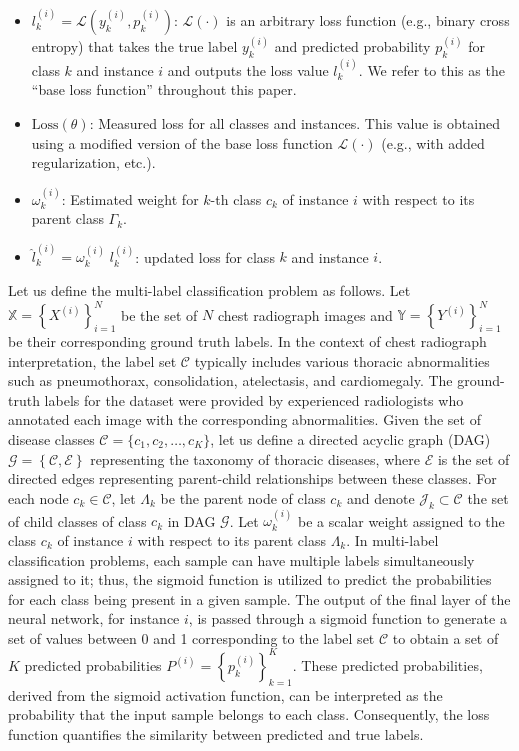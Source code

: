 \begin{itemize}
    \item  $l_k^{(i)} = \mathcal{L} \left(y_k^{(i)},p_k^{(i)}\right) $:  $\mathcal{L}(\cdot)$ is an arbitrary loss function (e.g., binary cross entropy) that takes the true label $y_k^{(i)}$ and predicted probability $p_k^{(i)}$ for class $k$ and instance $i$ and outputs the loss value $l_k^{(i)} $. We refer to this as the ``base loss function'' throughout this paper.
    \item  $\text{Loss}(\theta) $: Measured loss for all classes and instances. This value is obtained using a modified version of the base loss function $\mathcal{L}(\cdot) $ (e.g., with added regularization, etc.).
    \item  $\omega_k^{(i)} $: Estimated weight for $k$-th class $c_k $ of instance $i $ with respect to its parent class $\Gamma_k $.
    \item  ${\widehat l}_k^{(i)} = \omega_k^{(i)} \; l_k^{(i)} $: updated loss for class $k $ and instance $i $.
\end{itemize}
Let us define the multi-label classification problem as follows. Let $\mathbb{X} = {\left\{X^{(i)}\right\}}_{i=1}^{N} $ be the set of $N $ chest radiograph images and $\mathbb{Y} = {\left\{Y^{(i)}\right\}}_{i=1}^{N} $ be their corresponding ground truth labels. In the context of chest radiograph interpretation, the label set $\mathcal{C} $ typically includes various thoracic abnormalities such as pneumothorax, consolidation, atelectasis, and cardiomegaly. The ground-truth labels for the dataset were provided by experienced radiologists who annotated each image with the corresponding abnormalities.
Given the set of disease classes $\mathcal{C} = \{c_1,c_2,\dots,c_K\} $, let us define a directed acyclic graph (DAG) $\mathcal{G}=\left\{\mathcal{C},\mathcal{E}\right\} $ representing the taxonomy of thoracic diseases, where $\mathcal{E}$ is the set of directed edges representing parent-child relationships between these classes. For each node $c_k \in \mathcal{C} $, let $\Lambda_k$ be the parent node of class $c_k $ and denote $\mathcal{J}_k\subset \mathcal{C} $ the set of child classes of class $c_k $ in DAG $\mathcal{G}$.
Let $\omega_k^{(i)} $ be a scalar weight assigned to the class $c_k $ of instance $i $ with respect to its parent class $\Lambda_k$. In multi-label classification problems, each sample can have multiple labels simultaneously assigned to it; thus, the sigmoid function is utilized to predict the probabilities for each class being present in a given sample. The output of the final layer of the neural network, for instance $i $, is passed through a sigmoid function to generate a set of values between 0 and 1 corresponding to the label set $\mathcal{C} $ to obtain a set of $K $ predicted probabilities $P^{(i)}={\left\{p_k^{(i)}\right\}}_{k=1}^{K} $. These predicted probabilities, derived from the sigmoid activation function, can be interpreted as the probability that the input sample belongs to each class. Consequently, the loss function quantifies the similarity between predicted and true labels.
